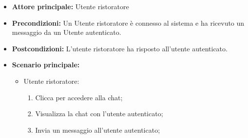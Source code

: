 \label{usecase:Chat con cliente}
\begin{itemize}
	\item \textbf{Attore principale:} Utente ristoratore
	\item \textbf{Precondizioni:}
	      Un Utente ristoratore è connesso al sistema e ha ricevuto un messaggio da un
	      Utente autenticato.
	\item \textbf{Postcondizioni:}
	      L'utente ristoratore ha risposto all'utente autenticato.
	\item \textbf{Scenario principale:}
	      \begin{itemize}
		      \item Utente ristoratore:
		            \begin{enumerate}
			            \item Clicca per accedere alla chat;
			            \item Visualizza la chat con l'utente autenticato;
			            \item Invia un messaggio all'utente autenticato;
		            \end{enumerate}
	      \end{itemize}
\end{itemize}
